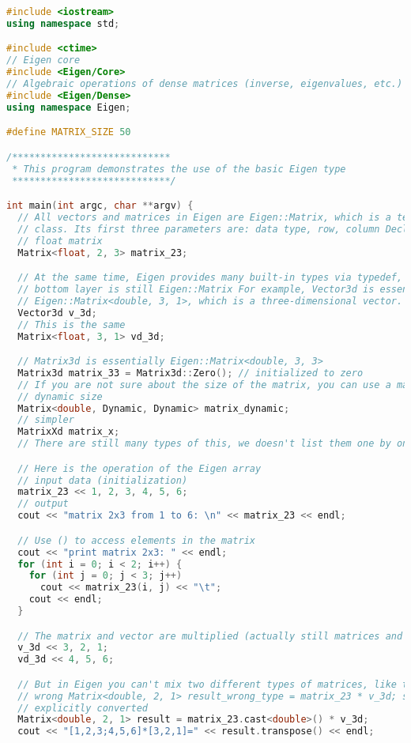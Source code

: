\begin{lstlisting}[language=c++,caption=slambook2/ch3/useEigen/eigenMatrix.cpp]
#include <iostream>
using namespace std;

#include <ctime>
// Eigen core
#include <Eigen/Core>
// Algebraic operations of dense matrices (inverse, eigenvalues, etc.)
#include <Eigen/Dense>
using namespace Eigen;

#define MATRIX_SIZE 50

/****************************
 * This program demonstrates the use of the basic Eigen type
 ****************************/

int main(int argc, char **argv) {
  // All vectors and matrices in Eigen are Eigen::Matrix, which is a template
  // class. Its first three parameters are: data type, row, column Declare a 2*3
  // float matrix
  Matrix<float, 2, 3> matrix_23;

  // At the same time, Eigen provides many built-in types via typedef, but the
  // bottom layer is still Eigen::Matrix For example, Vector3d is essentially
  // Eigen::Matrix<double, 3, 1>, which is a three-dimensional vector.
  Vector3d v_3d;
  // This is the same
  Matrix<float, 3, 1> vd_3d;

  // Matrix3d is essentially Eigen::Matrix<double, 3, 3>
  Matrix3d matrix_33 = Matrix3d::Zero(); // initialized to zero
  // If you are not sure about the size of the matrix, you can use a matrix of
  // dynamic size
  Matrix<double, Dynamic, Dynamic> matrix_dynamic;
  // simpler
  MatrixXd matrix_x;
  // There are still many types of this, we doesn't list them one by one.

  // Here is the operation of the Eigen array
  // input data (initialization)
  matrix_23 << 1, 2, 3, 4, 5, 6;
  // output
  cout << "matrix 2x3 from 1 to 6: \n" << matrix_23 << endl;

  // Use () to access elements in the matrix
  cout << "print matrix 2x3: " << endl;
  for (int i = 0; i < 2; i++) {
    for (int j = 0; j < 3; j++)
      cout << matrix_23(i, j) << "\t";
    cout << endl;
  }

  // The matrix and vector are multiplied (actually still matrices and matrices)
  v_3d << 3, 2, 1;
  vd_3d << 4, 5, 6;

  // But in Eigen you can't mix two different types of matrices, like this is
  // wrong Matrix<double, 2, 1> result_wrong_type = matrix_23 * v_3d; should be
  // explicitly converted
  Matrix<double, 2, 1> result = matrix_23.cast<double>() * v_3d;
  cout << "[1,2,3;4,5,6]*[3,2,1]=" << result.transpose() << endl;


\end{lstlisting}
